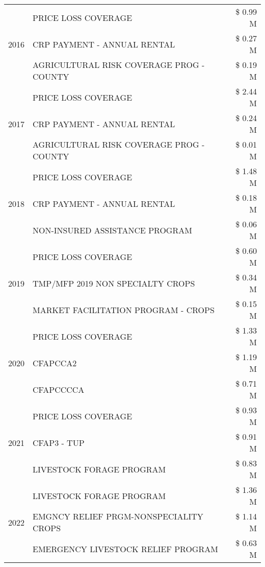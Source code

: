 \begin{tabular}{llr}
\cline{1-3}
\multirow[t]{3}{*}{2016} & PRICE LOSS COVERAGE & \$ 0.99 M \\
 & CRP PAYMENT - ANNUAL RENTAL & \$ 0.27 M \\
 & AGRICULTURAL RISK COVERAGE PROG - COUNTY & \$ 0.19 M \\
\cline{1-3}
\multirow[t]{3}{*}{2017} & PRICE LOSS COVERAGE & \$ 2.44 M \\
 & CRP PAYMENT - ANNUAL RENTAL & \$ 0.24 M \\
 & AGRICULTURAL RISK COVERAGE PROG - COUNTY & \$ 0.01 M \\
\cline{1-3}
\multirow[t]{3}{*}{2018} & PRICE LOSS COVERAGE & \$ 1.48 M \\
 & CRP PAYMENT - ANNUAL RENTAL & \$ 0.18 M \\
 & NON-INSURED ASSISTANCE PROGRAM & \$ 0.06 M \\
\cline{1-3}
\multirow[t]{3}{*}{2019} & PRICE LOSS COVERAGE & \$ 0.60 M \\
 & TMP/MFP 2019 NON SPECIALTY CROPS & \$ 0.34 M \\
 & MARKET FACILITATION PROGRAM - CROPS & \$ 0.15 M \\
\cline{1-3}
\multirow[t]{3}{*}{2020} & PRICE LOSS COVERAGE & \$ 1.33 M \\
 & CFAPCCA2 & \$ 1.19 M \\
 & CFAPCCCCA & \$ 0.71 M \\
\cline{1-3}
\multirow[t]{3}{*}{2021} & PRICE LOSS COVERAGE & \$ 0.93 M \\
 & CFAP3 - TUP & \$ 0.91 M \\
 & LIVESTOCK FORAGE PROGRAM & \$ 0.83 M \\
\cline{1-3}
\multirow[t]{3}{*}{2022} & LIVESTOCK FORAGE PROGRAM & \$ 1.36 M \\
 & EMGNCY RELIEF PRGM-NONSPECIALITY CROPS & \$ 1.14 M \\
 & EMERGENCY LIVESTOCK RELIEF PROGRAM & \$ 0.63 M \\
\cline{1-3}
\bottomrule
\end{tabular}
